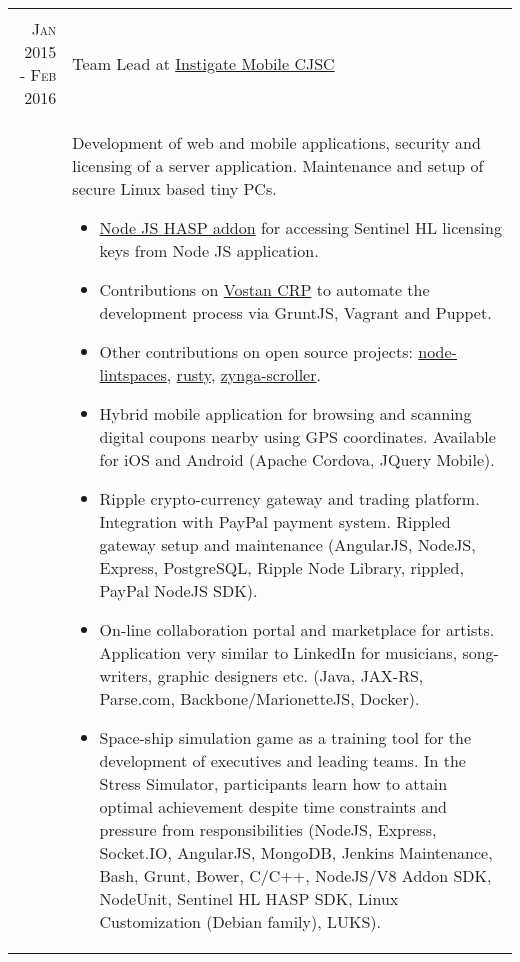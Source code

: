 \documentclass[a4paper,10pt]{article}
\begin{document}
\begin{tabular}{r|p{11cm}}
\multicolumn{2}{c}{} \\


\textsc{Jan 2015 - Feb 2016}
  & Team Lead at
    \href{http://www.instigatemobile.com/}{Instigate Mobile CJSC} \\

& \footnotesize{ Development of web and mobile applications, security and
licensing of a server application. Maintenance and setup of secure Linux based
tiny PCs.
  \begin{itemize}
    \item \href{https://github.com/vahe-evoyan/node-hasp/releases}
      {Node JS HASP addon} for accessing Sentinel HL licensing keys from
      Node JS application.
    \item Contributions on \href{https://github.com/InstigateMobile/vostan}
      {Vostan CRP} to automate the development process via GruntJS, Vagrant
      and Puppet.
    \item Other contributions on open source projects:
      \href{https://github.com/vahe-evoyan/node-lintspaces}{node-lintspaces},
      \href{https://github.com/InstigateMobileCJSC/rusty}{rusty},
      \href{https://github.com/InstigateMobileCJSC/scroller}{zynga-scroller}.
    \item Hybrid mobile application for browsing and scanning digital coupons
    nearby using GPS coordinates. Available for iOS and Android (Apache
    Cordova, JQuery Mobile).
    \item Ripple crypto-currency gateway and trading platform. Integration
    with PayPal payment system. Rippled gateway setup and maintenance
    (AngularJS, NodeJS, Express, PostgreSQL, Ripple Node Library, rippled,
    PayPal NodeJS SDK).
    \item On-line collaboration portal and marketplace for artists.
    Application very similar to LinkedIn for musicians, song-writers, graphic
    designers etc. (Java, JAX-RS, Parse.com, Backbone/MarionetteJS, Docker).
    \item Space-ship simulation game as a training tool for the development of
    executives and leading teams. In the Stress Simulator, participants learn
    how to attain optimal achievement despite time constraints and pressure
    from responsibilities (NodeJS, Express, Socket.IO, AngularJS, MongoDB, Jenkins Maintenance, Bash, Grunt, Bower, C/C++, NodeJS/V8 Addon SDK, NodeUnit, Sentinel HL HASP SDK, Linux Customization (Debian family), LUKS).
  \end{itemize}
} \\


\end{tabular}
\end{document}
